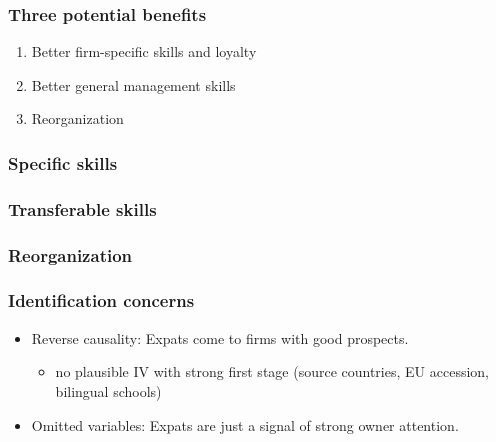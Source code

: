 \documentclass[aspectratio=43,compress,mathserif]{beamer}
\newcommand{\scaffolding}{\draw [->] (0,-0.5) --(14,-0.5);
\draw[thick] (7,-0.5)--(10,-0.5);

\foreach \x in {1,4,7,10,13}
\draw(\x cm,3pt - 0.5cm) -- (\x cm, -3pt - 0.5cm);
}
\begin{document}
\begin{frame}\frametitle{Three potential benefits}\hypertarget{Three potential benefits}{}
\begin{enumerate}\setcounter{enumi}{0}
\item Better firm-specific skills and loyalty

\item Better general management skills  

\item Reorganization




\end{enumerate}
\end{frame}



\begin{frame}\frametitle{Specific skills}\hypertarget{Specific skills}{}


\end{frame}



\begin{frame}\frametitle{Transferable skills}\hypertarget{Transferable skills}{}


\end{frame}



\begin{frame}\frametitle{Reorganization}\hypertarget{Reorganization}{}


\end{frame}



\begin{frame}\frametitle{Identification concerns}\hypertarget{Identification concerns}{}
\begin{itemize}
\item Reverse causality: Expats come to firms with good prospects.
\begin{itemize}
\item no plausible IV with strong first stage (source countries, EU accession, bilingual schools)
\end{itemize}

\item Omitted variables: Expats are just a signal of strong owner attention.




\end{itemize}
\end{frame}
\end{document}
